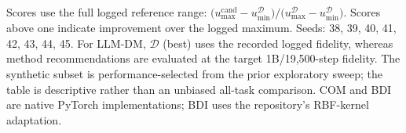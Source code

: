 \begin{table}
\begin{minipage}{0.98\textwidth}
\footnotesize
Scores use the full logged reference range: $\bigl(u_{\max}^{\mathrm{cand}}-u_{\min}^{\mathcal{D}}\bigr) / \bigl(u_{\max}^{\mathcal{D}}-u_{\min}^{\mathcal{D}}\bigr)$. Scores above one indicate improvement over the logged maximum. Seeds: 38, 39, 40, 41, 42, 43, 44, 45. For LLM-DM, $\mathcal{D}$ (best) uses the recorded logged fidelity, whereas method recommendations are evaluated at the target 1B/19,500-step fidelity. The synthetic subset is performance-selected from the prior exploratory sweep; the table is descriptive rather than an unbiased all-task comparison. COM and BDI are native PyTorch implementations; BDI uses the repository's RBF-kernel adaptation.
\end{minipage}
\end{table}
